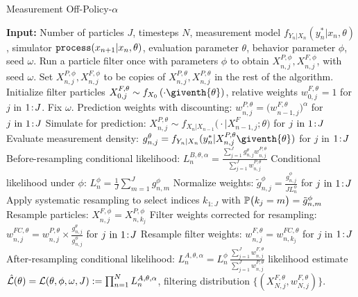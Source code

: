 \documentclass{article}
\begin{document}
\begin{algorithm}[H]
\centering
	\caption{Measurement Off-Policy-$\alpha$}
    \label{alg:mop}
	\begin{algorithmic}[1]
	     \STATE \textbf{Input:} Number of particles $J$, timesteps $N$, measurement model $f_{Y_n|X_n}(y_n^*|x_n, \theta)$, simulator $\texttt{process}(x_{n+1}|x_n, \theta)$, evaluation parameter $\theta$, behavior parameter $\phi$, seed $\omega$.
        \IF{$\theta \neq \phi$}
            \STATE Run a particle filter once with parameters $\phi$ to obtain $X_{n,j}^{P,\phi}, X_{n,j}^{F,\phi}$, with seed $\omega$.
        \ELSE
        \STATE Set $X_{n,j}^{P,\phi}, X_{n,j}^{F,\phi}$ to be copies of $X_{n,j}^{P,\theta}, X_{n,j}^{P,\theta}$ in the rest of the algorithm.
        \ENDIF
		\STATE Initialize filter particles ${X}_{0,j}^{F,\theta}\sim {f}_{{X}_{0}}\left(\cdot\giventh{\theta}\right)$, relative weights $w^{F,\theta}_{0,j}= 1$ for $j$ in ${1}\!:\!{J}$. Fix $\omega.$
            \STATE Prediction weights with discounting: $w_{n,j}^{P,\theta} = \big(w_{n-1,j}^{F,\theta}\big)^\alpha$ for $j\ \mathrm{in}\ {1}\!:\!{J}$
            \label{mop-alpha:discount}
            \STATE Simulate for prediction:
            ${X}_{n,j}^{P,\theta}\sim {f}_{{X}_{n}|{X}_{n-1}}\big(\cdot|{X}_{n-1,j}^{F};{\theta}\big)$ for $j\ \mathrm{in}\ {1}\!:\!{J}$ \label{mop-alpha:step1}
            \STATE Evaluate measurement density:
            $g^{\theta}_{n,j}={f}_{{Y}_{n}|{X}_{n}}(y_{n}^{*}|{X}_{n,j}^{P,\theta}\giventh{\theta})$ for $j$ in ${1}\!:\!{J}$
            \STATE Before-resampling conditional likelihood: $\displaystyle L_n^{B,\theta,\alpha} = \frac{\sum_{j=1}^Jg^\theta_{n,j} w^{P,\theta}_{n,j}}{\sum_{j=1}^J  w^{P,\theta}_{n,j}}$
            \STATE Conditional likelihood under $\phi$: 
            $L_n^{\phi} = \frac{1}{J}\sum_{m=1}^{J}g^{\phi}_{n,m}$
            \label{mop-alpha:Lphi}
            \STATE Normalize weights:
            $\displaystyle \tilde{g}^{\phi}_{n,j}= \frac{g^{\phi}_{n,j}}{JL_n^{\phi}}$
            for $j\ \mathrm{in}\ {1}\!:\!{J}$
            \STATE Apply systematic resampling to select indices $k_{1:J}$ with $\mathbb{P}\big(k_{j}=m\big) =\tilde{g}^{\phi}_{n,m}$ \label{mop-alpha:systematic}
            \STATE Resample particles: ${X}_{n,j}^{F,\phi}={X}_{n,k_{j}}^{P,\phi}$
            \STATE Filter weights corrected for resampling:
            $\displaystyle w^{FC,\theta}_{n,j}= w^{P,\theta}_{n,j} \times \frac{ g^{\theta}_{n,j}}{ g^{\phi}_{n,j}}$ for $j\ \mathrm{in}\ {1}\!:\!{J}$ \label{mop-alpha:weight:update}
            \STATE Resample filter weights:
            $w_{n,j}^{F,\theta}= {w}_{n,k_{j}}^{FC,\theta}$
            for $j$ in ${1}\!:\!{J}$ \label{mop-alpha:step2}
            \STATE After-resampling conditional likelihood: $\displaystyle L_n^{A,\theta,\alpha} = L_n^\phi \, \frac{\sum_{j=1}^J w^{F,\theta}_{n,j}}{\sum_{j=1}^J  w^{P,\theta}_{n,j}}$
            \ENDFOR
		\RETURN likelihood estimate $\hat{\mathcal{L}}(\theta) = \mathcal{L}(\theta, \phi, \omega, J) := \prod_{n=1}^N L_n^{A,\theta,\alpha}$, filtering distribution $\{(X_{N,j}^{F, \theta}, w^{F,\theta}_{N,j})\}.$
	\end{algorithmic}
\end{algorithm}
\end{document}
